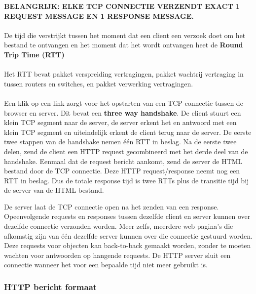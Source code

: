 \noindent \textbf{BELANGRIJK: ELKE TCP CONNECTIE VERZENDT EXACT 1 REQUEST MESSAGE EN 1 RESPONSE MESSAGE.}
\\\\
De tijd die verstrijkt tussen het moment dat een client een verzoek doet om het bestand te ontvangen en het moment dat het wordt ontvangen heet de \textbf{Round Trip Time (RTT)}
\\\\
Het RTT bevat pakket verspreiding vertragingen, pakket wachtrij vertraging in tussen routers en switches, en pakket verwerking vertragingen.
\\\\
Een klik op een link zorgt voor het opstarten van een TCP connectie tussen de browser en server. Dit bevat een \textbf{three way handshake}. De client stuurt een klein TCP segment naar de server, de server erkent het en antwoord met een klein TCP segment en uiteindelijk erkent de client terug naar de server. De eerste twee stappen van de handshake nemen één RTT in beslag. Na de eerste twee delen, zend de client een HTTP request gecombineerd met het derde deel van de handshake. Eenmaal dat de request bericht aankomt, zend de server de HTML bestand door de TCP connectie. Deze HTTP request/response neemt nog een RTT in beslag. Dus de totale response tijd is twee RTTs plus de transitie tijd bij de server van de HTML bestand.


De server laat de TCP connectie open na het zenden van een response. Opeenvolgende requests en responses tussen dezelfde client en server kunnen over dezelfde connectie verzonden worden. Meer zelfs, meerdere web pagina’s die afkomstig zijn van één dezelfde server kunnen over die connectie gestuurd worden. Deze requests voor objecten kan back-to-back gemaakt worden, zonder te moeten wachten voor antwoorden op hangende requests. De HTTP server sluit een connectie wanneer het voor een bepaalde tijd niet meer gebruikt is.

\clearpage

\subsubsection{HTTP bericht formaat}


